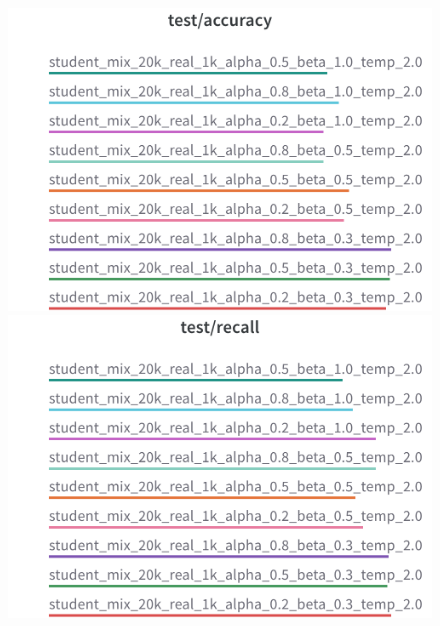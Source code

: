 \begin{figure}[H]
  \includegraphics[width=\linewidth]{./reports/alpha_x_beta/charts/Section-2-Panel-2-0smambxzh.png}
  \caption{}
  \endminipage\hfill
  \includegraphics[width=\linewidth]{./reports/alpha_x_beta/charts/Section-2-Panel-3-w31sbh9j5.png}
  \caption{}
  \endminipage
\end{figure}

